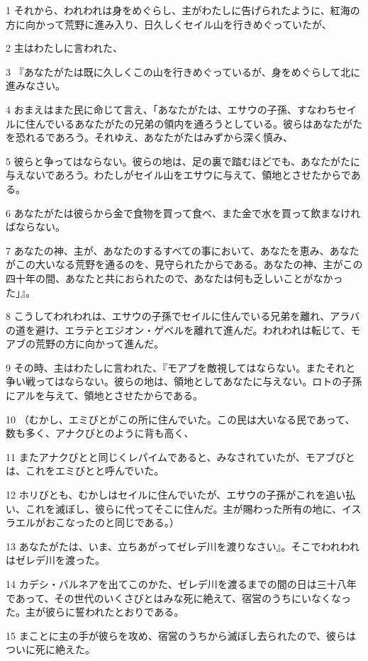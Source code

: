 \par 1 それから、われわれは身をめぐらし、主がわたしに告げられたように、紅海の方に向かって荒野に進み入り、日久しくセイル山を行きめぐっていたが、
\par 2 主はわたしに言われた、
\par 3 『あなたがたは既に久しくこの山を行きめぐっているが、身をめぐらして北に進みなさい。
\par 4 おまえはまた民に命じて言え、「あなたがたは、エサウの子孫、すなわちセイルに住んでいるあなたがたの兄弟の領内を通ろうとしている。彼らはあなたがたを恐れるであろう。それゆえ、あなたがたはみずから深く慎み、
\par 5 彼らと争ってはならない。彼らの地は、足の裏で踏むほどでも、あなたがたに与えないであろう。わたしがセイル山をエサウに与えて、領地とさせたからである。
\par 6 あなたがたは彼らから金で食物を買って食べ、また金で水を買って飲まなければならない。
\par 7 あなたの神、主が、あなたのするすべての事において、あなたを恵み、あなたがこの大いなる荒野を通るのを、見守られたからである。あなたの神、主がこの四十年の間、あなたと共におられたので、あなたは何も乏しいことがなかった」』。
\par 8 こうしてわれわれは、エサウの子孫でセイルに住んでいる兄弟を離れ、アラバの道を避け、エラテとエジオン・ゲベルを離れて進んだ。われわれは転じて、モアブの荒野の方に向かって進んだ。
\par 9 その時、主はわたしに言われた、『モアブを敵視してはならない。またそれと争い戦ってはならない。彼らの地は、領地としてあなたに与えない。ロトの子孫にアルを与えて、領地とさせたからである。
\par 10 （むかし、エミびとがこの所に住んでいた。この民は大いなる民であって、数も多く、アナクびとのように背も高く、
\par 11 またアナクびとと同じくレパイムであると、みなされていたが、モアブびとは、これをエミびとと呼んでいた。
\par 12 ホリびとも、むかしはセイルに住んでいたが、エサウの子孫がこれを追い払い、これを滅ぼし、彼らに代ってそこに住んだ。主が賜わった所有の地に、イスラエルがおこなったのと同じである。）
\par 13 あなたがたは、いま、立ちあがってゼレデ川を渡りなさい』。そこでわれわれはゼレデ川を渡った。
\par 14 カデシ・バルネアを出てこのかた、ゼレデ川を渡るまでの間の日は三十八年であって、その世代のいくさびとはみな死に絶えて、宿営のうちにいなくなった。主が彼らに誓われたとおりである。
\par 15 まことに主の手が彼らを攻め、宿営のうちから滅ぼし去られたので、彼らはついに死に絶えた。
